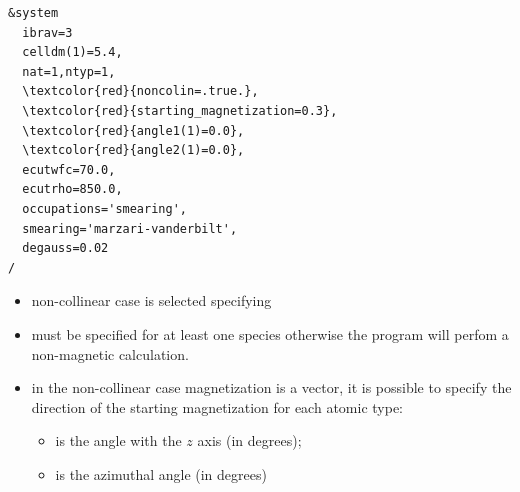 \documentclass[landscape]{foils}
\begin{document}
\begin{minipage}{11cm}
  \begin{Verbatim}[frame=single, commandchars=\\\{\},fontsize=\small]
&system
  ibrav=3
  celldm(1)=5.4,
  nat=1,ntyp=1,
  \textcolor{red}{noncolin=.true.},
  \textcolor{red}{starting_magnetization=0.3},
  \textcolor{red}{angle1(1)=0.0},
  \textcolor{red}{angle2(1)=0.0},
  ecutwfc=70.0,
  ecutrho=850.0,
  occupations='smearing', 
  smearing='marzari-vanderbilt', 
  degauss=0.02
/
  \end{Verbatim}
\end{minipage}
\hfill \parbox{14cm}{
  \begin{itemize}
    \small
    \item non-collinear case is selected specifying 
    \item {} must be specified for at least one species otherwise the
      program will perfom a non-magnetic calculation.
    \item in the non-collinear case magnetization is a vector, it is possible to specify the direction of 
      the starting magnetization for each atomic type:
      \begin{itemize}
        \item {}  is the  angle with the  $z$ axis (in degrees);
        \item {}  is the  azimuthal angle (in degrees)
      \end{itemize}
  \end{itemize}
}
\end{document}
